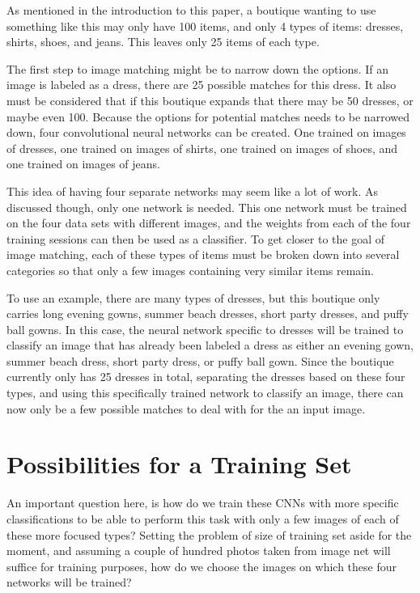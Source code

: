 \documentclass[12pt]{report} %
\begin{document}
	As mentioned in the introduction to this paper, a boutique wanting to use something like this may only have 100 items, and only 4 types of items: dresses, shirts, shoes, and jeans. This leaves only 25 items of each type. 
	
	The first step to image matching might be to narrow down the options. If an image is labeled as a dress, there are 25 possible matches for this dress. It also must be considered that if this boutique expands that there may be 50 dresses, or maybe even 100.  Because the options for potential matches needs to be narrowed down, four convolutional neural networks can be created. One trained on images of dresses, one trained on images of shirts, one trained on images of shoes, and one trained on images of jeans.
	
	This idea of having four separate networks may seem like a lot of work. As discussed though, only one network is needed. This one network must be trained on the four data sets with different images, and the weights from each of the four training sessions can then be used as a classifier. To get closer to the goal of image matching, each of these types of items must be broken down into several categories so that only a few images containing very similar items remain. 
	
	To use an example, there are many types of dresses, but this boutique only carries long evening gowns, summer beach dresses, short party dresses, and puffy ball gowns. In this case, the neural network specific to dresses will be trained to classify an image that has already been labeled a dress as either an evening gown, summer beach dress, short party dress, or puffy ball gown. Since the boutique currently only has 25 dresses in total, separating the dresses based on these four types, and using this specifically trained network to classify an image, there can now only be a few possible matches to deal with for the an input image. 
\section{Possibilities for a Training Set}
	
	An important question here, is how do we train these CNNs with more specific classifications to be able to perform this task with only a few images of each of these more focused types? Setting the problem of size of training set aside for the moment, and assuming a couple of hundred photos taken from image net will suffice for training purposes, how do we choose the images on which these four networks will be trained?
	
\end{document}
